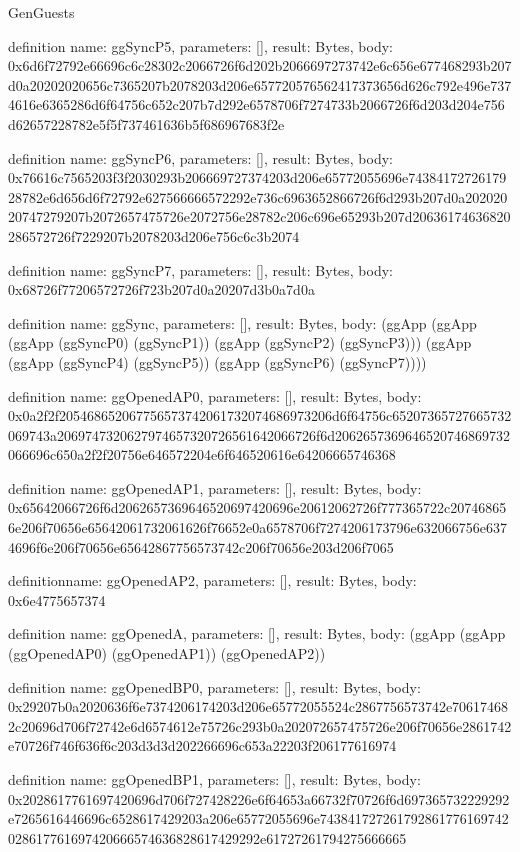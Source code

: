 \begin{lexlean}{GenGuests}
\begin{semanticmodule}
definition{
  name: ggSyncP5,
  parameters: [],
  result: Bytes,
  body: 0x6d6f72792e66696c6c28302c2066726f6d202b2066697273742e6c656e677468293b207d0a20202020656c7365207b2078203d206e657720576562417373656d626c792e496e7374616e6365286d6f64756c652c207b7d292e6578706f7274733b2066726f6d203d204e756d62657228782e5f5f737461636b5f686967683f2e
}

definition{
  name: ggSyncP6,
  parameters: [],
  result: Bytes,
  body: 0x76616c7565203f3f2030293b206669727374203d206e65772055696e7438417272617928782e6d656d6f72792e627566666572292e736c6963652866726f6d293b207d0a20202020747279207b2072657475726e2072756e28782c206c696e65293b207d20636174636820286572726f7229207b2078203d206e756c6c3b2074
}

definition{
  name: ggSyncP7,
  parameters: [],
  result: Bytes,
  body: 0x68726f77206572726f723b207d0a20207d3b0a7d0a
}

definition{
  name: ggSync,
  parameters: [],
  result: Bytes,
  body: (ggApp (ggApp (ggApp (ggSyncP0) (ggSyncP1)) (ggApp (ggSyncP2) (ggSyncP3))) (ggApp (ggApp (ggSyncP4) (ggSyncP5)) (ggApp (ggSyncP6) (ggSyncP7))))
}

definition{
  name: ggOpenedAP0,
  parameters: [],
  result: Bytes,
  body: 0x0a2f2f205468652067756573742061732074686973206d6f64756c65207365727665732069743a2069747320627974657320726561642066726f6d2062657369646520746869732066696c650a2f2f20756e646572204e6f646520616e64206665746368
}

definition{
  name: ggOpenedAP1,
  parameters: [],
  result: Bytes,
  body: 0x65642066726f6d2062657369646520697420696e20612062726f777365722c207468656e206f70656e65642061732061626f76652e0a6578706f7274206173796e632066756e6374696f6e206f70656e65642867756573742c206f70656e203d206f7065
}

definition{name: ggOpenedAP2, parameters: [], result: Bytes, body: 0x6e4775657374}

definition{
  name: ggOpenedA,
  parameters: [],
  result: Bytes,
  body: (ggApp (ggApp (ggOpenedAP0) (ggOpenedAP1)) (ggOpenedAP2))
}

definition{
  name: ggOpenedBP0,
  parameters: [],
  result: Bytes,
  body: 0x29207b0a2020636f6e7374206174203d206e65772055524c2867756573742e706174682c20696d706f72742e6d6574612e75726c293b0a202072657475726e206f70656e2861742e70726f746f636f6c203d3d3d202266696c653a22203f206177616974
}

definition{
  name: ggOpenedBP1,
  parameters: [],
  result: Bytes,
  body: 0x2028617761697420696d706f727428226e6f64653a66732f70726f6d697365732229292e7265616446696c6528617429203a206e65772055696e743841727261792861776169742028617761697420666574636828617429292e61727261794275666665
}


\end{semanticmodule}
\end{lexlean}
